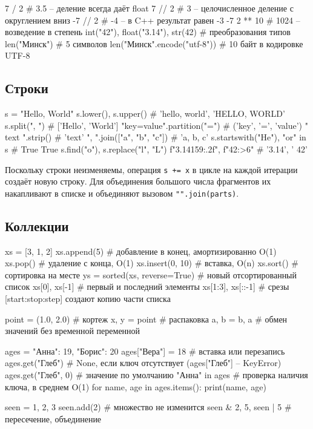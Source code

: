 \documentclass[11pt,a4paper]{article}
\newcommand{\code}[1]{\texttt{#1}}
\begin{document}
\begin{py}
7 / 2       # 3.5   -- деление всегда даёт float
7 // 2      # 3     -- целочисленное деление с округлением вниз
-7 // 2     # -4    -- в C++ результат равен -3
-7 %
2 ** 10     # 1024  -- возведение в степень
int("42"), float("3.14"), str(42)   # преобразования типов
len("Минск")                        # 5 символов
len("Минск".encode("utf-8"))        # 10 байт в кодировке UTF-8
\end{py}

\subsection{Строки}

\begin{py}
s = "Hello, World"
s.lower(), s.upper()            # 'hello, world', 'HELLO, WORLD'
s.split(", ")                   # ['Hello', 'World']
"key=value".partition("=")      # ('key', '=', 'value')
"  text \n".strip()             # 'text'
", ".join(["a", "b", "c"])      # 'a, b, c'
s.startswith("He"), "or" in s   # True True
s.find("o"), s.replace("l", "L")
f"{3.14159:.2f}", f"{42:>6}"    # '3.14', '    42'
\end{py}

Поскольку строки неизменяемы, операция \code{s += x} в цикле на каждой итерации создаёт новую
строку. Для объединения большого числа фрагментов их накапливают в списке и объединяют вызовом
\code{"".join(parts)}.

\subsection{Коллекции}

\begin{py}
xs = [3, 1, 2]
xs.append(5)            # добавление в конец, амортизированно O(1)
xs.pop()                # удаление с конца, O(1)
xs.insert(0, 10)        # вставка, O(n)
xs.sort()               # сортировка на месте
ys = sorted(xs, reverse=True)   # новый отсортированный список
xs[0], xs[-1]           # первый и последний элементы
xs[1:3], xs[::-1]       # срезы [start:stop:step] создают копию части списка

point = (1.0, 2.0)      # кортеж
x, y = point            # распаковка
a, b = b, a             # обмен значений без временной переменной

ages = {"Анна": 19, "Борис": 20}
ages["Вера"] = 18       # вставка или перезапись
ages.get("Глеб")        # None, если ключ отсутствует (ages["Глеб"] -- KeyError)
ages.get("Глеб", 0)     # значение по умолчанию
"Анна" in ages          # проверка наличия ключа, в среднем O(1)
for name, age in ages.items():
    print(name, age)

seen = {1, 2, 3}
seen.add(2)             # множество не изменится
seen & {2, 5}, seen | {5}   # пересечение, объединение
\end{py}
\end{document}
